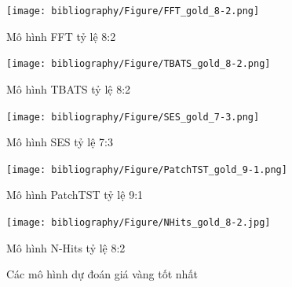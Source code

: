 \documentclass[conference]{IEEEtran}
\begin{document}
\begin{figure}[t]
\begin{minipage}{0.5\textwidth}
\begin{minipage}{0.45\textwidth}
            \texttt{[image: bibliography/Figure/FFT\_gold\_8-2.png]} 
            \caption{Mô hình FFT tỷ lệ 8:2}
        \end{minipage}
         \hfill
        \begin{minipage}{0.45\textwidth}
            \centering
            \texttt{[image: bibliography/Figure/TBATS\_gold\_8-2.png]} 
            \caption{Mô hình TBATS tỷ lệ 8:2}
        \end{minipage}
        \hfill
        \begin{minipage}{0.45\textwidth}
            \centering
            \texttt{[image: bibliography/Figure/SES\_gold\_7-3.png]} 
            \caption{Mô hình SES tỷ lệ 7:3}
        \end{minipage}
        \hfill
        \begin{minipage}{0.45\textwidth}
            \centering
            \texttt{[image: bibliography/Figure/PatchTST\_gold\_9-1.png]} 
            \caption{Mô hình PatchTST tỷ lệ 9:1}
        \end{minipage}
        \begin{minipage}{0.45\textwidth}
            \centering
            \texttt{[image: bibliography/Figure/NHits\_gold\_8-2.jpg]} 
            \caption{Mô hình N-Hits tỷ lệ 8:2}
        \end{minipage}
    \end{minipage}
    \caption{Các mô hình dự đoán giá vàng tốt nhất}
    \label{fig:gold-images}
\end{figure}
\end{document}
